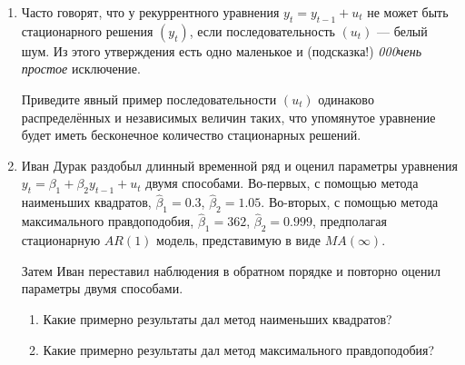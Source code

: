 \documentclass[12pt]{article}
\begin{document}
\begin{enumerate}
\item Часто говорят, что у рекуррентного уравнения $y_t = y_{t-1} + u_t$ не может быть стационарного решения $(y_t)$, 
если последовательность $(u_t)$ — белый шум. 
Из этого утверждения есть одно маленькое и (подсказка!) \textit{000чень простое} исключение. 

Приведите явный пример последовательности  $(u_t)$ одинаково распределённых и независимых величин
таких, что упомянутое уравнение будет иметь бесконечное количество стационарных решений. 


\item Иван Дурак раздобыл длинный временной ряд и оценил параметры уравнения $y_t = \beta_1 + \beta_2 y_{t-1} + u_t$ 
двумя способами.
Во-первых, с помощью метода наименьших квадратов, $\hat\beta_1 = 0.3$, $\hat\beta_2 = 1.05$. 
Во-вторых, с помощью метода максимального правдоподобия, $\hat\beta_1 = 362$, $\hat\beta_2 = 0.999$,
предполагая стационарную $AR(1)$ модель, представимую в виде $MA(\infty)$.

Затем Иван переставил наблюдения в обратном порядке и повторно оценил параметры двумя способами. 
\begin{enumerate}
    \item Какие примерно результаты дал метод наименьших квадратов?
    \item Какие примерно результаты дал метод максимального правдоподобия?
\end{enumerate}


\end{enumerate}
\end{document}
